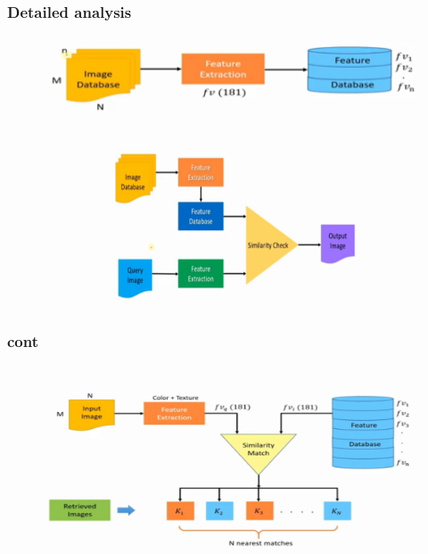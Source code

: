\documentclass{beamer}
\begin{document}
\begin{frame}
	\frametitle{Detailed analysis}
		\begin{figure}[H]
		\centering
		\includegraphics[width=120mm,height=25mm]{fig/21.png}
	\end{figure}
	\begin{figure}[H]
	\centering
	\includegraphics[width=120mm,height=50mm]{fig/19.png}
\end{figure}
\end{frame}
\begin{frame}
	\frametitle{cont}
		\begin{figure}[H]
		\centering
		\includegraphics[width=120mm,height=60mm]{fig/20.png}
	\end{figure}
\end{frame}
	
\end{document}
